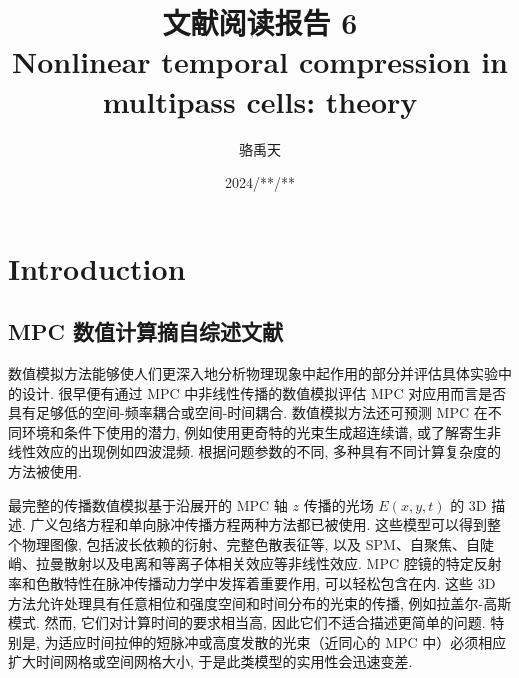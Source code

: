 \documentclass[14pt,a4paper,oneside]{article}
\title{\textbf{文献阅读报告 6\\Nonlinear temporal compression in multipass cells: theory}}                           %
\author{骆禹天}                                           %
\date{2024/**/**}                                        %
\numberwithin{equation}{subsection}             %
\numberwithin{figure}{subsection}               %
\begin{document}

\maketitle

\setcounter{page}{1}          %


\tableofcontents              %

\newpage
\setcounter{page}{1}          %








\section{Introduction}

\subsection{MPC 数值计算\;摘自综述文献\cite{hannaNonlinearOpticsMultipass2021}}

数值模拟方法能够使人们更深入地分析物理现象中起作用的部分并评估具体实验中的设计. 很早便有通过 MPC 中非线性传播的数值模拟评估 MPC 对应用而言是否具有足够低的空间-频率耦合或空间-时间耦合\cite{hannaNonlinearTemporalCompression2017}.  数值模拟方法还可预测 MPC 在不同环境和条件下使用的潜力, 例如使用更奇特的光束\cite{caoMultipasscellbasedPostcompressionRadially2019, caoRelativisticNearsinglecycleOptical2020}生成超连续谱\cite{meiThermodynamicNonlinearOptical2022},  或了解寄生非线性效应的出现例如四波混频\cite{hannaHybridPulsePropagation2020a}. 根据问题参数的不同, 多种具有不同计算复杂度的方法被使用. 

最完整的传播数值模拟基于沿展开的 MPC 轴 $z$ 传播的光场 $E(x,y,t)$ 的 3D 描述. 广义包络方程和单向脉冲传播方程两种方法都已被使用. 这些模型可以得到整个物理图像, 包括波长依赖的衍射、完整色散表征等, 以及 SPM、自聚焦、自陡峭、拉曼散射以及电离和等离子体相关效应等非线性效应. MPC 腔镜的特定反射率和色散特性在脉冲传播动力学中发挥着重要作用, 可以轻松包含在内. 这些 3D 方法允许处理具有任意相位和强度空间和时间分布的光束的传播, 例如拉盖尔-高斯模式\cite{kaumannsSpectralBroadening1122021b, caoMultipasscellbasedPostcompressionRadially2019}. 然而, 它们对计算时间的要求相当高, 因此它们不适合描述更简单的问题. 特别是, 为适应时间拉伸的短脉冲或高度发散的光束（近同心的 MPC 中）必须相应扩大时间网格或空间网格大小, 于是此类模型的实用性会迅速变差. 
\end{document}
